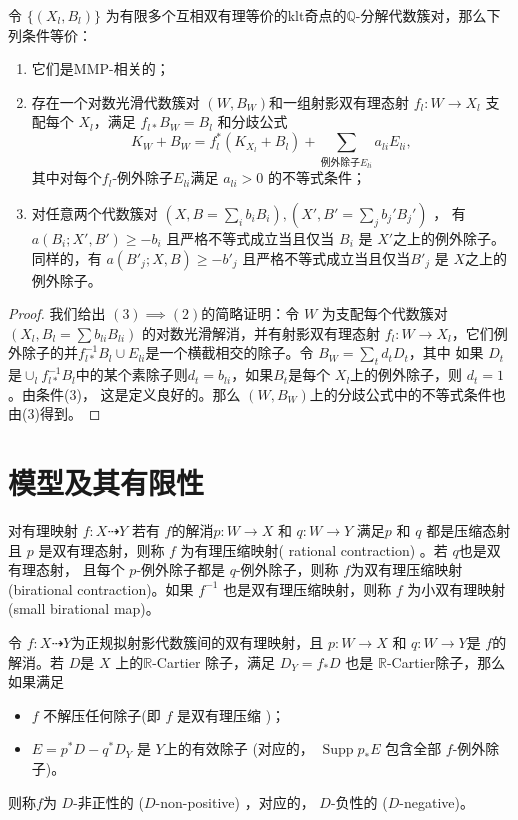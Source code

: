 \begin{lemma}\label{MMPrelatedConditation}
  \cite[Proposition 3.4]{brunoLogSarkisovProgram1995}
  令 $ \{(X_l,B_l)\} $ 为有限多个互相双有理等价的klt奇点的$ \mathbb{Q} $-分解代数簇对，那么下列条件等价：
  \begin{enumerate}
    \item 它们是MMP-相关的；
    \item 存在一个对数光滑代数簇对 $ (W,B_W) $和一组射影双有理态射  $ f_l:W\to  X_l $ 支配每个 $ X_l $，满足 $ f_{l*}B_W=B_l $ 和分歧公式
      \[ K_W+B_W=f_l^*(K_{X_l}+B_l)+\sum_{\text{例外除子}E_{li}}{a_{li}E_{li}} ,\]
          其中对每个$ f_l $-例外除子$E_{li}$满足 $a_{li}>0$ 的不等式条件；
    \item 对任意两个代数簇对 $ (X,B=\sum_ib_{i }B_i),(X',B'=\sum_{j}b_{j}'B_{j}') $ ， 有  $ a(B_i;X',B')\geqslant -b_i $ 且严格不等式成立当且仅当 $ B_i $ 是 $ X' $之上的例外除子。同样的，有 $ a(B'_j;X,B)\geqslant -b'_j $ 且严格不等式成立当且仅当$ B'_j $ 是 $ X $之上的例外除子。
  \end{enumerate}
\end{lemma}
\begin{proof}
  我们给出  $(3) \implies (2)$的简略证明：令 $W$ 为支配每个代数簇对 $(X_l,B_l=\sum b_{li}B_{li})$ 的对数光滑解消，并有射影双有理态射 $f_l:W\to X_l$，它们例外除子的并$f_{l*}^{-1}B_l\cup E_{li}$是一个横截相交的除子。令 $B_W=\sum_t d_tD_t $，其中  如果 $D_t$ 是$\cup_l f_{l*}^{-1}B_l$中的某个素除子则$d_t = b_{li}$，如果$B_{t}$是每个 $X_{l}$上的例外除子，则  $d_t=1$。由条件(3)， 这是定义良好的。那么 $(W,B_{W})$上的分歧公式中的不等式条件也由(3)得到。 \end{proof}

\section{模型及其有限性}

\begin{definition}
  \cite[\S 2]{haconSarkisovProgram2012} 对有理映射 $f:X\dashrightarrow Y$  若有 $f$的解消$p:W\to X$ 和 $q:W\to Y$ 满足$p$  和 $q$ 都是压缩态射且 $p$ 是双有理态射，则称 $f$ 为有理压缩映射( rational contraction)  。若 $ q$也是双有理态射， 且每个 $p$-例外除子都是 $q$-例外除子，则称 $f$为双有理压缩映射 (birational contraction)。如果 $f^{-1}$ 也是双有理压缩映射，则称 $f$ 为小双有理映射 (small birational map)。
\end{definition}

\begin{definition}\label{negativemap}
  \cite[Definition 3.6.1]{BCHM10}令 $f:X\dashrightarrow Y$为正规拟射影代数簇间的双有理映射，且 $p:W\to X$ 和 $q:W\to Y$是 $f$的解消。若 $D$是 $X$ 上的$\mathbb{R}$-Cartier 除子，满足  $D_{Y}=f_*D$ 也是 $\mathbb{R}$-Cartier除子，那么如果满足
  \begin{itemize}
    \item $f$ 不解压任何除子(即 $f$ 是双有理压缩 )；
    \item $E=p^{*}D-q^*D_Y$ 是  $Y$上的有效除子 (对应的， $\operatorname{Supp}p_*E$ 包含全部 $f$-例外除子)。
  \end{itemize}
 则称$f$为 $D$-非正性的  ($D$-non-positive) ，对应的， $D$-负性的 ($D$-negative)。
\end{definition}

